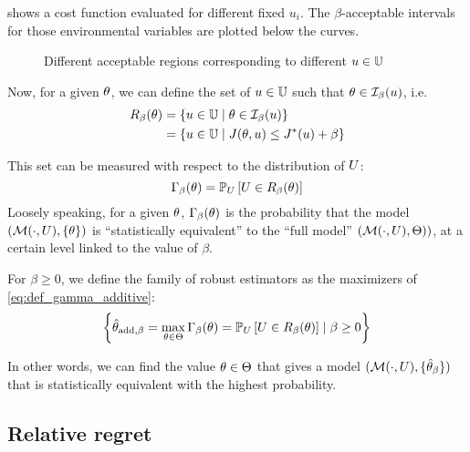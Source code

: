 \documentclass[../../Main_ManuscritThese.tex]{subfiles}
\newcommand\imgpath{/home/victor/acadwriting/Manuscrit/Text/Chapter3/img/}
\begin{document}
 shows a cost function evaluated for different fixed $u_i$. The $\beta$-acceptable intervals for those environmental variables are plotted below the curves.
\begin{figure}[ht]
  \centering
  
  \caption{\label{fig:lik_interval_threshold} Different acceptable regions corresponding to different $u \in \mathbb{U}$}
\end{figure}

  Now, for a given $\theta$, we can define the set of $u\in \mathbb{U}$ such that $\theta \in  \mathcal{I}_{\beta}(u)$, i.e.\
  \begin{align}
    R_{\beta}(\theta) &= \left\{u\in \mathbb{U} \mid \theta \in \mathcal{I}_{\beta}(u) \right\} \\
           &= \left\{u\in \mathbb{U} \mid J(\theta, u)  \leq J^*(u) + \beta \right\}
  \end{align}

  This set can be measured with respect to the distribution of $U$:
  \begin{equation}
    \label{eq:def_gamma_additive}
    \Gamma_\beta(\theta) = \mathbb{P}_U\left[U \in R_{\beta}(\theta)\right]
  \end{equation}
  Loosely speaking, for a given $\theta$, $\Gamma_{\beta}(\theta)$ is the probability that the model $(\mathcal{M}(\cdot, U), \{\theta\})$ is ``statistically equivalent'' to the ``full model'' $\left(\mathcal{M}(\cdot, U), \Theta)\right)$, at a certain level linked to the value of $\beta$.

  \begin{definition}
    For $\beta \geq 0$, we define the family of robust estimators as the maximizers of \cref{eq:def_gamma_additive}:
    \begin{equation}
      \left\{\hat{\theta}_{\mathrm{add,\beta}} = \max_{\theta\in\Theta} \Gamma_{\beta}(\theta)= \mathbb{P}_U\left[U \in R_{\beta}(\theta)\right]\mid \beta \geq 0\right\}
    \end{equation}
  \end{definition}

  In other words, we can find the value $\theta\in\Theta$ that gives a model $(\mathcal{M}(\cdot, U), \{\hat{\theta}_{\mathrm{\beta}}\})$ that is statistically equivalent with the highest probability.


  
  \subsection{Relative regret}
\end{document}
